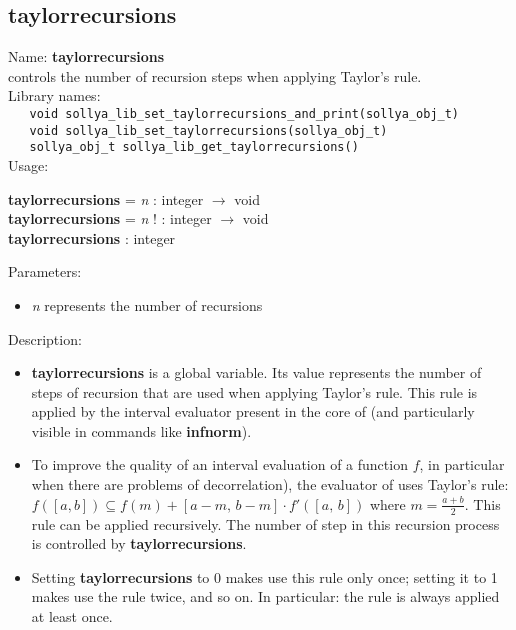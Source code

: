 \subsection{taylorrecursions}
\label{labtaylorrecursions}
\noindent Name: \textbf{taylorrecursions}\\
\phantom{aaa}controls the number of recursion steps when applying Taylor's rule.\\[0.2cm]
\noindent Library names:\\
\verb|   void sollya_lib_set_taylorrecursions_and_print(sollya_obj_t)|\\
\verb|   void sollya_lib_set_taylorrecursions(sollya_obj_t)|\\
\verb|   sollya_obj_t sollya_lib_get_taylorrecursions()|\\[0.2cm]
\noindent Usage: 
\begin{center}
\textbf{taylorrecursions} = \emph{n} : \textsf{integer} $\rightarrow$ \textsf{void}\\
\textbf{taylorrecursions} = \emph{n} ! : \textsf{integer} $\rightarrow$ \textsf{void}\\
\textbf{taylorrecursions} : \textsf{integer}\\
\end{center}
Parameters: 
\begin{itemize}
\item \emph{n} represents the number of recursions
\end{itemize}
\noindent Description: \begin{itemize}

\item \textbf{taylorrecursions} is a global variable. Its value represents the number of steps
   of recursion that are used when applying Taylor's rule. This rule is applied
   by the interval evaluator present in the core of \sollya (and particularly
   visible in commands like \textbf{infnorm}).

\item To improve the quality of an interval evaluation of a function $f$, in 
   particular when there are problems of decorrelation), the evaluator of \sollya
   uses Taylor's rule:  $f([a,b]) \subseteq f(m) + [a-m,\,b-m] \cdot f'([a,\,b])$ where $m=\frac{a+b}{2}$.
   This rule can be applied recursively.
   The number of step in this recursion process is controlled by \textbf{taylorrecursions}.

\item Setting \textbf{taylorrecursions} to 0 makes \sollya use this rule only once;
   setting it to 1 makes \sollya use the rule twice, and so on.
   In particular: the rule is always applied at least once.
\end{itemize}
